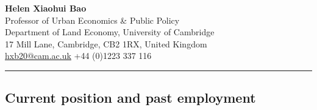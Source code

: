 \documentclass[11pt,a4paper]{article}
\begin{document}
\begin{center}
  {\Huge\bfseries\color{NavyBlue} Helen Xiaohui Bao}\\[8pt]
  {\large Professor of Urban Economics \& Public Policy}\\[2pt]
  Department of Land Economy, University of Cambridge\\
  17 Mill Lane, Cambridge, CB2 1RX, United Kingdom\\[4pt]
  \href{mailto:hxb20@cam.ac.uk}{hxb20@cam.ac.uk} \quad \textbar \quad +44
(0)1223 337 116
\end{center}

\vspace{6pt}
\hrule
\vspace{12pt}

\subsection{Current position and past
employment}\label{current-position-and-past-employment}
\end{document}
